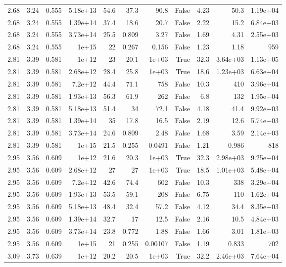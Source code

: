 \begin{table}
\begin{tabular}{rrrrrrrrrrr}
2.68 & 3.24 & 0.555 & 5.18e+13 & 54.6 & 37.3 & 90.8 & False & 4.23 & 50.3 & 1.19e+04 \\
2.68 & 3.24 & 0.555 & 1.39e+14 & 37.4 & 18.6 & 20.7 & False & 2.22 & 15.2 & 6.84e+03 \\
2.68 & 3.24 & 0.555 & 3.73e+14 & 25.5 & 0.809 & 3.27 & False & 1.69 & 4.31 & 2.55e+03 \\
2.68 & 3.24 & 0.555 & 1e+15 & 22 & 0.267 & 0.156 & False & 1.23 & 1.18 & 959 \\
2.81 & 3.39 & 0.581 & 1e+12 & 23 & 20.1 & 1e+03 & True & 32.3 & 3.64e+03 & 1.13e+05 \\
2.81 & 3.39 & 0.581 & 2.68e+12 & 28.4 & 25.8 & 1e+03 & True & 18.6 & 1.23e+03 & 6.63e+04 \\
2.81 & 3.39 & 0.581 & 7.2e+12 & 44.4 & 71.1 & 758 & False & 10.3 & 410 & 3.96e+04 \\
2.81 & 3.39 & 0.581 & 1.93e+13 & 56.3 & 61.9 & 262 & False & 6.8 & 132 & 1.95e+04 \\
2.81 & 3.39 & 0.581 & 5.18e+13 & 51.4 & 34 & 72.1 & False & 4.18 & 41.4 & 9.92e+03 \\
2.81 & 3.39 & 0.581 & 1.39e+14 & 35 & 17.8 & 16.5 & False & 2.19 & 12.6 & 5.74e+03 \\
2.81 & 3.39 & 0.581 & 3.73e+14 & 24.6 & 0.809 & 2.48 & False & 1.68 & 3.59 & 2.14e+03 \\
2.81 & 3.39 & 0.581 & 1e+15 & 21.5 & 0.255 & 0.0491 & False & 1.21 & 0.986 & 818 \\
2.95 & 3.56 & 0.609 & 1e+12 & 21.6 & 20.3 & 1e+03 & True & 32.3 & 2.98e+03 & 9.25e+04 \\
2.95 & 3.56 & 0.609 & 2.68e+12 & 27 & 27 & 1e+03 & True & 18.5 & 1.01e+03 & 5.48e+04 \\
2.95 & 3.56 & 0.609 & 7.2e+12 & 42.6 & 74.4 & 602 & False & 10.3 & 338 & 3.29e+04 \\
2.95 & 3.56 & 0.609 & 1.93e+13 & 53.5 & 59.1 & 208 & False & 6.75 & 110 & 1.62e+04 \\
2.95 & 3.56 & 0.609 & 5.18e+13 & 48.4 & 32.4 & 57.2 & False & 4.12 & 34.4 & 8.35e+03 \\
2.95 & 3.56 & 0.609 & 1.39e+14 & 32.7 & 17 & 12.5 & False & 2.16 & 10.5 & 4.84e+03 \\
2.95 & 3.56 & 0.609 & 3.73e+14 & 23.8 & 0.772 & 1.88 & False & 1.66 & 3.01 & 1.81e+03 \\
2.95 & 3.56 & 0.609 & 1e+15 & 21 & 0.255 & 0.00107 & False & 1.19 & 0.833 & 702 \\
3.09 & 3.73 & 0.639 & 1e+12 & 20.2 & 20.5 & 1e+03 & True & 32.2 & 2.46e+03 & 7.64e+04 \\

\end{tabular}
\end{table}

